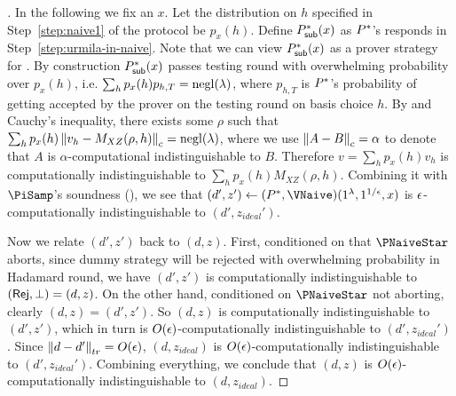 \begin{proof}[]
	 In the following we fix an $x$. Let the distribution on $h$ specified in Step~\ref{step:naive1} of the protocol be $p_x(h)$. Define $P^*_{\mathsf{sub}}(x)$ as $P^*$'s responds in Step~\ref{step:urmila-in-naive}. Note that we can view $P^*_{\mathsf{sub}}(x)$ as a prover strategy for . By construction $P^*_{\mathsf{sub}}(x)$ passes testing round with overwhelming probability over $p_x(h)$, i.e. $\sum_h p_x(h) p_{h,T} =\operatorname{negl}(\lambda)$, where $p_{h,T}$ is $P^*$'s probability of getting accepted by the prover on the testing round on basis choice $h$. By  and Cauchy's inequality, there exists some $\rho$ such that  $\sum_h p_x(h) \left\lVert v_h -M_{XZ}(\rho, h)\right\rVert_c = \operatorname{negl}(\lambda)$, where we use $\left\lVert A-B\right\rVert_c=\alpha$ to denote that $A$ is $\alpha$-computational indistinguishable to $B$. Therefore $v= \sum_h p_x(h) v_h$ is computationally indistinguishable to $\sum_h p_x(h) M_{XZ}(\rho, h)$. Combining it with $\PiSamp$'s soundness (), 
	we see that $(d', z')\leftarrow(\Pstar, \VNaive)(1^\lambda, 1^{1/\epsilon}, x)$  is $\epsilon$-computationally indistinguishable to $(d', z_{ideal}')$.

	Now we relate $(d', z')$ back to $(d, z)$.
	First, conditioned on that $\PNaiveStar$ aborts, since dummy strategy will be rejected with overwhelming probability in Hadamard round,
	we have $(d', z')$ is computationally indistinguishable to $(\mathsf{Rej}, \bot)=(d, z)$.
	On the other hand, conditioned on $\PNaiveStar$ not aborting, clearly $(d, z)=(d', z')$.
	So $(d, z)$ is computationally indistinguishable to $(d', z')$,
	which in turn is $O(\epsilon)$-computationally indistinguishable to $(d', z_{ideal}')$.
	Since $\left\lVert d-d'\right\rVert_{tr}= O(\epsilon)$,
	 $(d, z_{ideal})$ is $O(\epsilon)$-computationally indistinguishable to $(d', z_{ideal}')$.
	Combining everything, we conclude that $(d, z)$ is $O(\epsilon)$-computationally indistinguishable to $(d, z_{ideal})$.
\end{proof}


